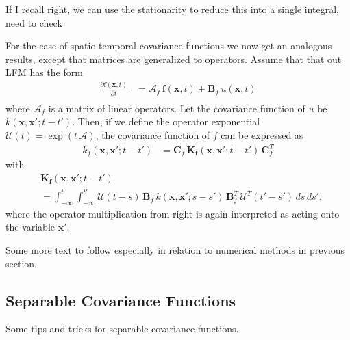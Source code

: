 \documentclass[journal]{IEEEtran}
\newcommand{\simo}[1]{{\color{red}#1}}
\begin{document}
\simo{If I recall right, we can use the stationarity to reduce this into a single integral, need to check}

For the case of spatio-temporal covariance functions we now get an analogous results, except that matrices are generalized to operators. Assume that that out LFM has the form
%
\begin{equation}
\begin{split}
  \frac{\partial \mathbf{f}(\mathbf{x},t)}{\partial t}
  &= \mathbf{\mathcal{A}}_f \, \mathbf{f}(\mathbf{x},t) + \mathbf{B}_f \, u(\mathbf{x},t) \\
\end{split}
\end{equation}
%
where $\mathbf{\mathcal{A}}_f$ is a matrix of linear operators. Let the covariance function of $u$ be $k(\mathbf{x},\mathbf{x}';t - t')$. Then, if we define the operator exponential $\mathbf{\mathcal{U}}(t) = \exp(t \, \mathbf{\mathcal{A}})$, the covariance function of $f$ can be expressed as
%
\begin{equation}
\begin{split}
  k_f(\mathbf{x},\mathbf{x}';t-t') &=
  \mathbf{C}_f \, \mathbf{K}_\mathbf{f}(\mathbf{x},\mathbf{x}';t-t') \, \mathbf{C}_f^T
\end{split}
\end{equation}
%
with
%
\begin{equation}
\begin{split}
  &\mathbf{K}_\mathbf{f}(\mathbf{x},\mathbf{x}';t-t')
  \\ &
  =
  \int_{-\infty}^{t} \int_{-\infty}^{t'}
  \mathbf{\mathcal{U}}(t - s) \, \mathbf{B}_f \, k(\mathbf{x},\mathbf{x}';s - s') \,
  \mathbf{B}_f^T \, \mathbf{\mathcal{U}}^T(t' - s') \, ds \, ds',
\end{split}
\label{eq:vfcov}
\end{equation}
%
where the operator multiplication from right is again interpreted as acting onto the variable $\mathbf{x}'$.

\simo{Some more text to follow especially in relation to numerical methods in previous section.}

\subsection{Separable Covariance Functions}
%
\simo{Some tips and tricks for separable covariance functions.}
\end{document}

